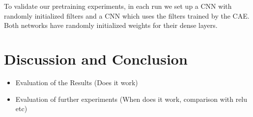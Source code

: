\documentclass[draft]{article}
\begin{document}
  To validate our pretraining experiments, in each run we set up a CNN with randomly initialized filters and a CNN which
  uses the filters trained by the CAE. Both networks have randomly initialized weights for their dense layers.


\section{Discussion and Conclusion}
  
  \begin{itemize}

    \item Evaluation of the Results         (Does it work)
    \item Evaluation of further experiments (When does it work, comparison with relu etc)

  \end{itemize}
\end{document}
